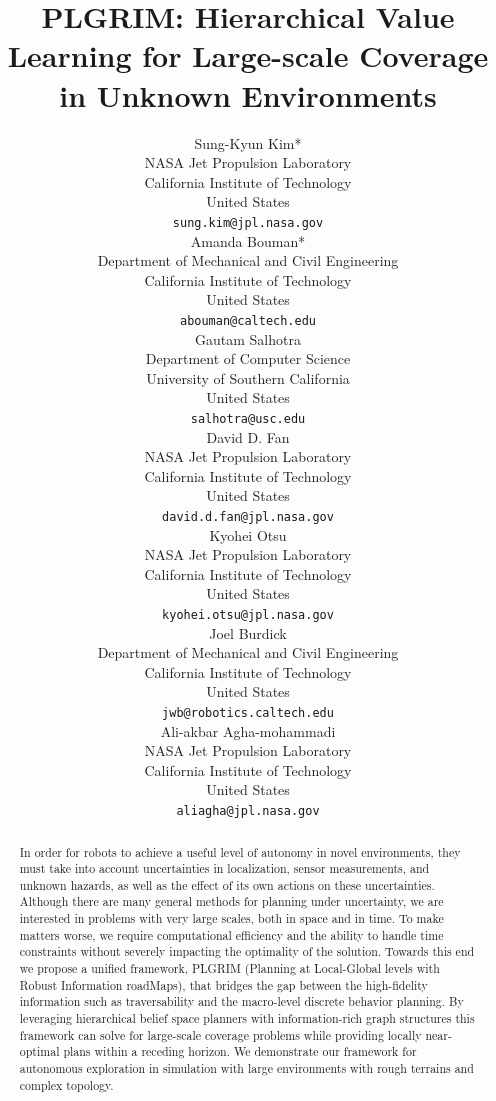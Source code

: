 \documentclass{article}
\title{
PLGRIM: Hierarchical Value Learning for Large-scale Coverage in Unknown Environments
}
\author{
  Sung-Kyun Kim*\\
  NASA Jet Propulsion Laboratory\\
  California Institute of Technology\\
  United States\\
  \texttt{sung.kim@jpl.nasa.gov} \\
  \And
  Amanda Bouman*\\
  Department of Mechanical and Civil Engineering\\
  California Institute of Technology\\
  United States\\
  \texttt{abouman@caltech.edu} \\
  \And
  Gautam Salhotra\\
  Department of Computer Science\\
  University of Southern California\\
  United States\\
  \texttt{salhotra@usc.edu} \\
  \And
  David D. Fan\\
  NASA Jet Propulsion Laboratory\\
  California Institute of Technology\\
  United States\\
  \texttt{david.d.fan@jpl.nasa.gov} \\
  \And
  Kyohei Otsu\\
  NASA Jet Propulsion Laboratory\\
  California Institute of Technology\\
  United States\\
  \texttt{kyohei.otsu@jpl.nasa.gov} \\
  \And
  Joel Burdick\\
  Department of Mechanical and Civil Engineering\\
  California Institute of Technology\\
  United States\\
  \texttt{jwb@robotics.caltech.edu} \\
  \And
  Ali-akbar Agha-mohammadi\\
  NASA Jet Propulsion Laboratory\\
  California Institute of Technology\\
  United States\\
  \texttt{aliagha@jpl.nasa.gov} \\
}
\newcommand{\gautam}[1]{{\color{cyan}Gautam: #1 }}
\begin{document}
\maketitle


\begin{abstract}
In order for robots to achieve a useful level of autonomy in novel environments, they must take into account uncertainties in localization, sensor measurements, and unknown hazards, as well as the effect of its own actions on these uncertainties.  Although there are many general methods for planning under uncertainty, we are interested in problems with very large scales, both in space and in time.  To make matters worse, we require computational efficiency and the ability to handle time constraints without severely impacting the optimality of the solution.
Towards this end we propose a unified framework, PLGRIM (Planning at Local-Global levels with Robust Information roadMaps), that bridges the gap between the high-fidelity information such as traversability and the macro-level discrete behavior planning.
By leveraging hierarchical belief space planners with information-rich graph structures this framework can solve for large-scale coverage problems while providing locally near-optimal plans within a receding horizon.
We demonstrate our framework for autonomous exploration in simulation with large environments with rough terrains and complex topology.
\end{abstract}


\end{document}
